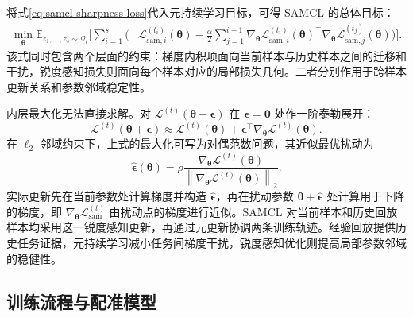 将式\eqref{eq:samcl-sharpness-loss}代入元持续学习目标，可得 SAMCL 的总体目标：
\begin{equation}
\begin{aligned}
\min_{\boldsymbol{\theta}}
\mathbb{E}_{z_1,\ldots,z_s\sim\mathcal{Q}_t}
\Bigg[
\sum_{i=1}^{s}
\Bigg(&
\mathcal{L}^{(t_i)}_{\mathrm{sam},i}(\boldsymbol{\theta})
-
\frac{\alpha}{2}
\sum_{j=1}^{i-1}
\nabla_{\boldsymbol{\theta}}
\mathcal{L}^{(t_i)}_{\mathrm{sam},i}(\boldsymbol{\theta})^{\top}
\nabla_{\boldsymbol{\theta}}
\mathcal{L}^{(t_j)}_{\mathrm{sam},j}(\boldsymbol{\theta})
\Bigg)
\Bigg].
\end{aligned}
\label{eq:samcl-full-objective}
\end{equation}
该式同时包含两个层面的约束：梯度内积项面向当前样本与历史样本之间的迁移和干扰，锐度感知损失则面向每个样本对应的局部损失几何。二者分别作用于跨样本更新关系和参数邻域稳定性。

内层最大化无法直接求解。对
$\mathcal{L}^{(t)}(\boldsymbol{\theta}+\boldsymbol{\epsilon})$
在 $\boldsymbol{\epsilon}=\boldsymbol{0}$ 处作一阶泰勒展开：
\begin{equation}
\mathcal{L}^{(t)}(\boldsymbol{\theta}+\boldsymbol{\epsilon})
\approx
\mathcal{L}^{(t)}(\boldsymbol{\theta})
+
\boldsymbol{\epsilon}^{\top}
\nabla_{\boldsymbol{\theta}}
\mathcal{L}^{(t)}(\boldsymbol{\theta}).
\label{eq:samcl-taylor}
\end{equation}
在 $\ell_2$ 邻域约束下，上式的最大化可写为对偶范数问题，其近似最优扰动为
\begin{equation}
\widehat{\boldsymbol{\epsilon}}(\boldsymbol{\theta})
=
\rho
\frac{
\nabla_{\boldsymbol{\theta}}
\mathcal{L}^{(t)}(\boldsymbol{\theta})
}{
\left\|
\nabla_{\boldsymbol{\theta}}
\mathcal{L}^{(t)}(\boldsymbol{\theta})
\right\|_2
}.
\label{eq:samcl-perturbation}
\end{equation}
实际更新先在当前参数处计算梯度并构造
$\widehat{\boldsymbol{\epsilon}}$，再在扰动参数
$\boldsymbol{\theta}+\widehat{\boldsymbol{\epsilon}}$
处计算用于下降的梯度，即
$\nabla_{\boldsymbol{\theta}}\mathcal{L}^{(t)}_{\mathrm{sam}}$
由扰动点的梯度进行近似。SAMCL 对当前样本和历史回放样本均采用这一锐度感知更新，再通过元更新协调两条训练轨迹。经验回放提供历史任务证据，元持续学习减小任务间梯度干扰，锐度感知优化则提高局部参数邻域的稳健性。

\subsection{训练流程与配准模型}
\label{subsec:samcl-algorithm}

